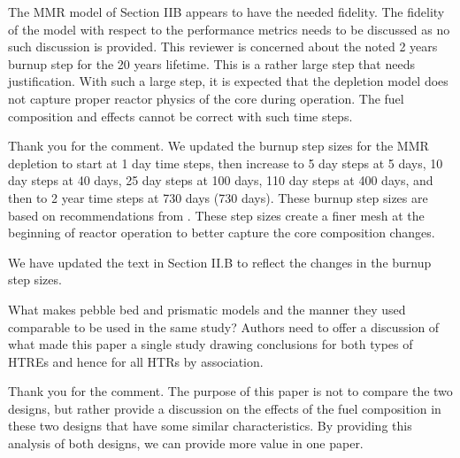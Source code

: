 \documentclass[answers,11pt]{exam}
\begin{document}
\begin{questions}
        \question The MMR model of Section IIB appears to have the needed fidelity. The
        fidelity of the model with respect to the performance metrics needs to be
        discussed as no such discussion is provided. This reviewer is concerned about
        the noted 2 years burnup step for the 20 years lifetime. This is a rather large
        step that needs justification. With such a large step,  it is expected that the
        depletion model does not capture proper reactor physics of the core during
        operation. The fuel composition and effects cannot be correct with such time
        steps. 
        \begin{solution}
                Thank you for the comment. We updated the 
                burnup step sizes for the MMR depletion 
                to start at 1 day time steps, then increase
                to 5 day steps at 5 days, 10 day steps at 40 days,  
                25 day steps at 100 days,
                110 day steps at 400 days, and then
                to 2 year time steps at 730 days (730 days). 
                These burnup step sizes are based on recommendations from 
                \cite{walter_adaptive_2016}. These step sizes create a finer 
                mesh at the beginning of reactor operation to better 
                capture the core composition changes. 

                We have updated the text in Section II.B to reflect the changes 
                in the burnup step sizes. 
        \end{solution} 


        \question What makes pebble bed and prismatic models and the manner they used
        comparable to be used in the same study? Authors need to offer a discussion of
        what made this paper a single study drawing conclusions for both types of HTREs
        and hence for all HTRs by association. 
        \begin{solution}
                Thank you for the comment. The purpose of 
                this paper is not to compare the two designs, 
                but rather provide a discussion on the 
                effects of the fuel composition in these two 
                designs that have some similar 
                characteristics. By providing this analysis 
                of both designs, we can provide more value in 
                one paper. 
                

\end{solution}
\end{questions}
\end{document}
